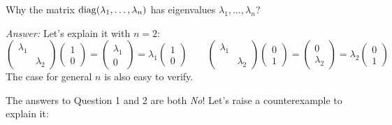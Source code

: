 \begin{remark}
Why the matrix $\operatorname{diag}(\lambda_1,\dots,\lambda_n)$ has eigenvalues $\lambda_1,\dots,\lambda_n$?

\textit{Answer: }Let's explain it with $n=2:$
\[
\begin{pmatrix}
\lambda_1&\\&\lambda_2
\end{pmatrix}\begin{pmatrix}
1\\0
\end{pmatrix}=\begin{pmatrix}
\lambda_1\\0
\end{pmatrix}=\lambda_1\begin{pmatrix}
1\\0
\end{pmatrix}\qquad
\begin{pmatrix}
\lambda_1&\\&\lambda_2
\end{pmatrix}\begin{pmatrix}
0\\1
\end{pmatrix}=\begin{pmatrix}
0\\\lambda_2
\end{pmatrix}=\lambda_2\begin{pmatrix}
0\\1
\end{pmatrix}
\]
The case for general $n$ is also easy to verify.
\end{remark}

The answers to Question 1 and 2 are both \emph{No}! Let's raise a counterexample to explain it:

